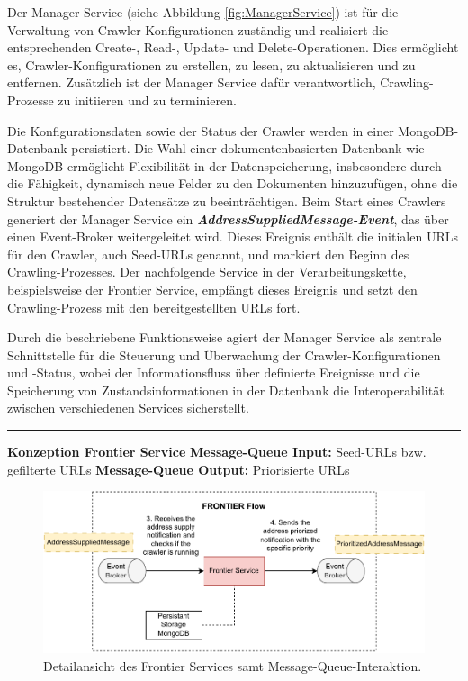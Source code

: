 Der Manager Service (siehe Abbildung \ref{fig:ManagerService}) ist für die Verwaltung von \newline Crawler-Konfigurationen zuständig und realisiert die entsprechenden Create-, Read-, Update- und Delete-Operationen. Dies ermöglicht es, Crawler-Konfigurationen zu erstellen, zu lesen, zu aktualisieren und zu entfernen. Zusätzlich ist der Manager Service dafür verantwortlich, Crawling-Prozesse zu initiieren und zu terminieren.

Die Konfigurationsdaten sowie der Status der Crawler werden in einer MongoDB-Datenbank persistiert. Die Wahl einer dokumentenbasierten Datenbank wie MongoDB ermöglicht Flexibilität in der Datenspeicherung, insbesondere durch die Fähigkeit, dynamisch neue Felder zu den Dokumenten hinzuzufügen, ohne die Struktur bestehender Datensätze zu beeinträchtigen.
Beim Start eines Crawlers generiert der Manager Service ein \textbf{\textit{AddressSuppliedMessage-Event}}, das über einen Event-Broker weitergeleitet wird. Dieses Ereignis enthält die initialen URLs für den Crawler, auch Seed-URLs genannt, und markiert den Beginn des Crawling-Prozesses. Der nachfolgende Service in der Verarbeitungskette, beispielsweise der Frontier Service, empfängt dieses Ereignis und setzt den Crawling-Prozess mit den bereitgestellten URLs fort.

Durch die beschriebene Funktionsweise agiert der Manager Service als zentrale Schnittstelle für die Steuerung und Überwachung der Crawler-Konfigurationen und -Status, wobei der Informationsfluss über definierte Ereignisse und die Speicherung von Zustandsinformationen in der Datenbank die Interoperabilität zwischen verschiedenen Services sicherstellt.\newline
\noindent\rule{\textwidth}{1pt}
\textbf{Konzeption Frontier Service}
\newline
\textbf{Message-Queue Input:} Seed-URLs bzw. gefilterte URLs\newline
\textbf{Message-Queue Output:} Priorisierte URLs\newline
\begin{figure}[H]
    \centering
    \includegraphics[width=14cm]{images/40_concept/FrontierService.drawio.pdf}
    \caption[Detailansicht des Frontier Services]{Detailansicht des Frontier Services samt Message-Queue-Interaktion.}
    \label{fig:FrontierService}
\end{figure}


